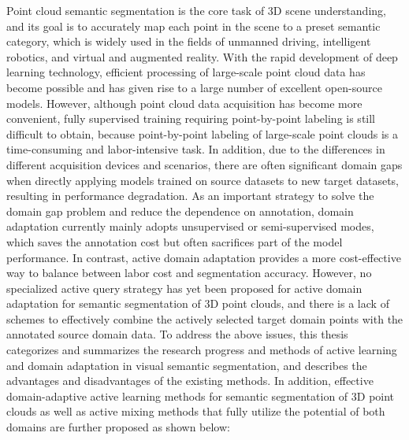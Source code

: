 Point cloud semantic segmentation is the core task of 3D scene understanding, and its goal is to accurately map each point in the scene to a preset semantic category, which is widely used in the fields of unmanned driving, intelligent robotics, and virtual and augmented reality. With the rapid development of deep learning technology, efficient processing of large-scale point cloud data has become possible and has given rise to a large number of excellent open-source models. However, although point cloud data acquisition has become more convenient, fully supervised training requiring point-by-point labeling is still difficult to obtain, because point-by-point labeling of large-scale point clouds is a time-consuming and labor-intensive task. In addition, due to the differences in different acquisition devices and scenarios, there are often significant domain gaps when directly applying models trained on source datasets to new target datasets, resulting in performance degradation. As an important strategy to solve the domain gap problem and reduce the dependence on annotation, domain adaptation currently mainly adopts unsupervised or semi-supervised modes, which saves the annotation cost but often sacrifices part of the model performance. In contrast, active domain adaptation provides a more cost-effective way to balance between labor cost and segmentation accuracy. However, no specialized active query strategy has yet been proposed for active domain adaptation for semantic segmentation of 3D point clouds, and there is a lack of schemes to effectively combine the actively selected target domain points with the annotated source domain data. To address the above issues, this thesis categorizes and summarizes the research progress and methods of active learning and domain adaptation in visual semantic segmentation, and describes the advantages and disadvantages of the existing methods. In addition, effective domain-adaptive active learning methods for semantic segmentation of 3D point clouds as well as active mixing methods that fully utilize the potential of both domains are further proposed as shown below:

